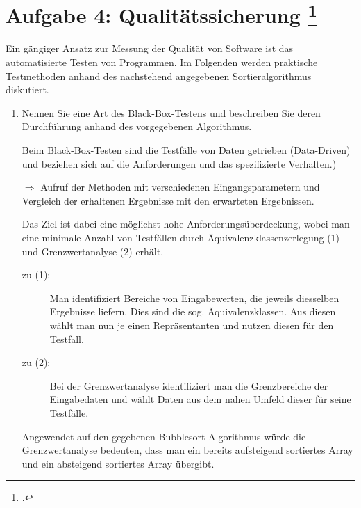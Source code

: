 \documentclass{lehramt-informatik-aufgabe}
\begin{document}
\section{Aufgabe 4: Qualitätssicherung
\footcite{examen:46116:2017:09}
}

Ein gängiger Ansatz zur Messung der Qualität von Software ist das
automatisierte Testen von Programmen. Im Folgenden werden praktische
Testmethoden anhand des nachstehend angegebenen Sortieralgorithmus
diskutiert.



\begin{enumerate}


\item Nennen Sie eine Art des Black-Box-Testens
und beschreiben Sie deren Durchführung anhand des vorgegebenen
Algorithmus.

\begin{antwort}
Beim Black-Box-Testen sind die Testfälle von Daten getrieben
(Data-Driven) und beziehen sich auf die Anforderungen und das
spezifizierte Verhalten.)

$\Rightarrow$ Aufruf der Methoden mit verschiedenen
Eingangsparametern und Vergleich der erhaltenen Ergebnisse mit den
erwarteten Ergebnissen.

Das Ziel ist dabei eine möglichst hohe
Anforderungsüberdeckung, wobei man eine
minimale Anzahl von Testfällen durch
Äquivalenzklassenzerlegung (1) und
Grenzwertanalyse (2) erhält.

\begin{description}
\item[zu (1):] Man identifiziert Bereiche von Eingabewerten, die jeweils
diesselben Ergebnisse liefern. Dies sind die sog. Äquivalenzklassen. Aus
diesen wählt man nun je einen Repräsentanten und nutzen diesen für den
Testfall.

\item[zu (2):] Bei der Grenzwertanalyse identifiziert man die
Grenzbereiche der Eingabedaten und wählt Daten aus dem nahen Umfeld
dieser für seine Testfälle.
\end{description}

Angewendet auf den gegebenen Bubblesort-Algorithmus würde die
Grenzwertanalyse bedeuten, dass man ein bereits aufsteigend sortiertes
Array und ein absteigend sortiertes Array übergibt.
\end{antwort}


\end{enumerate}
\end{document}
